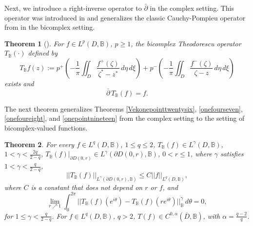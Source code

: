 \documentclass[suppldata]{interact}
\theoremstyle{plain}%
\newtheorem{theorem}{Theorem}[section]
\theoremstyle{definition}
\theoremstyle{remark}
\newcommand{\p}{\partial}
\newcommand{\dbar}{\bar\partial}
\newcommand{\bc}{\mathbb{B}}
\begin{document}
Next, we introduce a right-inverse operator to $\dbar$ in the complex setting. This operator was introduced in \cite{FundBicomplex} and generalizes the classic Cauchy-Pompieu operator from \cite{Vek} in the bicomplex setting. 

\begin{theorem}[\cite{Vek, FundBicomplex, BCTransmutation, BCBergman, conjbel}]\label{Thm: bctoperator}
    For $f \in L^p(D, \bc)$, $p \geq 1$, the bicomplex Theodorescu operator $T_{\bc}(\cdot)$ defined by 
    \[
        T_{\bc} f(z) := p^+\left(-\frac{1}{\pi} \iint_D \frac{f^+(\zeta)}{\zeta^* - z^*} \,d\eta\,d\xi \right) + p^-\left(- \frac{1}{\pi}\iint_{D} \frac{ f^-(\zeta)}{\zeta- z}\,d\eta\,d\xi \right) 
    \]
    exists and 
    \[
        \dbar \, T_{\bc} (f) = f. 
    \]
\end{theorem}

The next theorem generalizes Theorems \ref{Vekonepointtwentysix}, \ref{onefourseven}, \ref{onefoureight}, and \ref{onepointnineteen} from the complex setting to the setting of bicomplex-valued functions. 

\begin{theorem}\label{bctbehavior}
For every $f \in L^q(D, \bc)$, $1 \leq q \leq 2$, $T_\bc(f) \in L^\gamma(D,\bc)$, $1 < \gamma < \frac{2q}{2-q}$, $T_\bc(f)|_{\p D(0,r)} \in L^\gamma(\p D(0,r), \bc)$, $0 < r \leq 1$, where $\gamma$ satisfies $1 < \gamma < \frac{q}{2-q}$,  
\[
||T_\bc(f)||_{L^\gamma(\p D(0,r),\bc)} \leq C ||f||_{L^q(D,\bc)},
\]
where $C$ is a constant that does not depend on $r$ or $f$, and
\[
\lim_{r\nearrow 1} \int_0^{2\pi} ||T_\bc(f)(e^{i\theta}) - T_\bc(f)(re^{i\theta})||_\bc^\gamma \,d\theta = 0, 
\]
for $1 \leq \gamma < \frac{q}{2-q}$. For $f \in L^q(D,\bc)$, $q > 2$, $T(f) \in C^{0,\alpha}(\overline{D},\bc)$, with $\alpha = \frac{ q-2}{q}$. 
\end{theorem}
\end{document}
